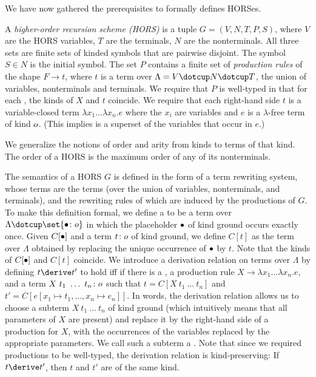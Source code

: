 \documentclass[../../diss.tex]{subfiles}
\begin{document}
We have now gathered the prerequisites to formally defines HORSes.

    A \emph{higher-order recursion scheme (HORS)} is a tuple $G = (V, N, T, P, S)$, where
        $V$ are the HORS variables, $T$ are the terminals, $N$ are the nonterminals.
        All three sets are finite sets of kinded symbols that are pairwise disjoint.
        The symbol $S \in N$ is the initial symbol.
        The set $P$ contains a finite set of \emph{production rules} of the shape $F \to t$, where $t$ is a term over $\Lambda = V \dotcup N \dotcup T$, the union of variables, nonterminals and terminals.
        We require that $P$ is well-typed in that for each , the kinds of $X$ and $t$ coincide.
        We require that each right-hand side $t$ is a variable-closed term $\lambda x_1 \ldots \lambda x_n . e$ where the $x_i$ are variables and $e$ is a $\lambda$-free term of kind $o$. (This implies  is a superset of the variables that occur in $e$.)

We generalize the notions of order and arity from kinds to terms of that kind.
The order of a HORS is the maximum order of any of its nonterminals.

The semantics of a HORS $G$ is defined in the form of a term rewriting system, whose terms are the terms (over the union of variables, nonterminals, and terminals), and the rewriting rules of which are induced by the productions of $G$.
To make this definition formal, we define a  to be a term over $\Lambda \dotcup \set{ \contextplaceholder \colon \ground}$ in which the placeholder $\bullet$ of kind ground occurs exactly once.
Given $C[\bullet]$ and a term $t \colon o$ of kind ground, we define $C[t]$ as the term over $\Lambda$ obtained by replacing the unique occurrence of $\bullet$ by $t$.
Note that the kinds of $C[\bullet]$ and $C[t]$ coincide.
We introduce a derivation relation on terms over $\Lambda$ by defining $t \derive t'$ to hold iff if there is a , a production rule $X \to \lambda x_1 \ldots \lambda x_n.e$, and a term $X\ t_1\ \ldots\ t_n \colon o$ such that
$t = C[X\ t_1\ \ldots\ t_n]$ and $t' = C[e[x_1 \mapsto t_1, \ldots, x_n \mapsto e_n]]$.
In words, the derivation relation allows us to choose a subterm $X\ t_1\ \ldots\ t_n$ of kind ground (which intuitively means that all parameters of $X$ are present) and replace it by the right-hand side of a production for $X$, with the occurrences of the variables replaced by the appropriate parameters.
We call such a subterm a .
Note that since we required productions to be well-typed, the derivation relation is kind-preserving: If $t \derive t'$, then $t$ and $t'$ are of the same kind.
\end{document}
